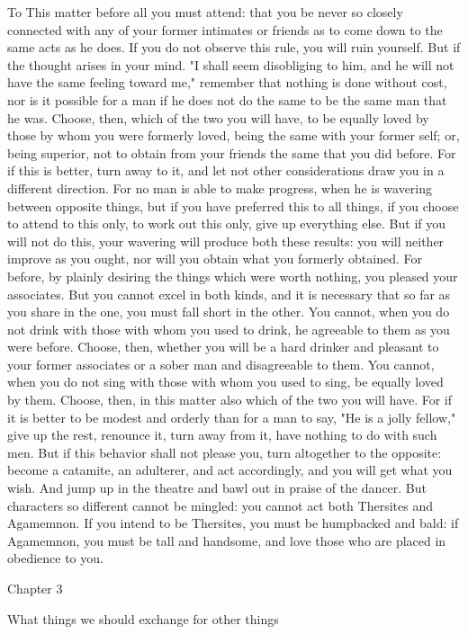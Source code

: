 \documentclass[a4paper]{article}
\begin{document}
    To This matter before all you must attend: that you be never so closely
connected with any of your former intimates or friends as to come down to the
same acts as he does. If you do not observe this rule, you will ruin yourself.
But if the thought arises in your mind. "I shall seem disobliging to him, and
he will not have the same feeling toward me," remember that nothing is done
without cost, nor is it possible for a man if he does not do the same to be the
same man that he was. Choose, then, which of the two you will have, to be
equally loved by those by whom you were formerly loved, being the same with
your former self; or, being superior, not to obtain from your friends the same
that you did before. For if this is better, turn away to it, and let not other
considerations draw you in a different direction. For no man is able to make
progress, when he is wavering between opposite things, but if you have
preferred this to all things, if you choose to attend to this only, to work out
this only, give up everything else. But if you will not do this, your wavering
will produce both these results: you will neither improve as you ought, nor
will you obtain what you formerly obtained. For before, by plainly desiring the
things which were worth nothing, you pleased your associates. But you cannot
excel in both kinds, and it is necessary that so far as you share in the one,
you must fall short in the other. You cannot, when you do not drink with those
with whom you used to drink, he agreeable to them as you were before. Choose,
then, whether you will be a hard drinker and pleasant to your former associates
or a sober man and disagreeable to them. You cannot, when you do not sing with
those with whom you used to sing, be equally loved by them. Choose, then, in
this matter also which of the two you will have. For if it is better to be
modest and orderly than for a man to say, "He is a jolly fellow," give up the
rest, renounce it, turn away from it, have nothing to do with such men. But if
this behavior shall not please you, turn altogether to the opposite: become a
catamite, an adulterer, and act accordingly, and you will get what you wish.
And jump up in the theatre and bawl out in praise of the dancer. But characters
so different cannot be mingled: you cannot act both Thersites and Agamemnon. If
you intend to be Thersites, you must be humpbacked and bald: if Agamemnon, you
must be tall and handsome, and love those who are placed in obedience to you.

Chapter 3

What things we should exchange for other things
\end{document}
